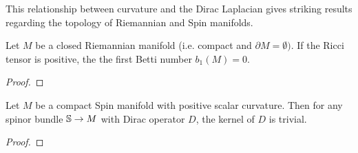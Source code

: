 %
This relationship between curvature and the Dirac Laplacian gives striking results
regarding the topology of Riemannian and Spin manifolds.
%
\begin{thm}
Let $M$ be a closed Riemannian manifold (i.e. compact and $\partial M = \emptyset)$.
If the Ricci tensor is positive, the the first Betti number $b_1(M) = 0$.
\end{thm}
%
\begin{proof} %

\end{proof}
%
\begin{thm}
Let $M$ be a compact Spin manifold with positive scalar curvature. Then for any
spinor bundle $\S \to M$ with Dirac operator $D$, the kernel of $D$ is trivial.
\end{thm}
%
\begin{proof} %

\end{proof}
%